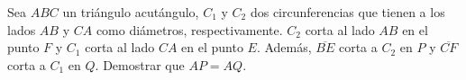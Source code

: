 Sea $ABC$ un triángulo acutángulo, $C_1$ y $C_2$ dos circunferencias que tienen a los lados $AB$ y $CA$ como diámetros, respectivamente. $C_2$ corta al lado $AB$ en el punto $F$ y $C_1$ corta al lado $CA$ en el punto $E$. Además, $\overline{BE}$ corta a $C_2$ en $P$ y $\overline{CF}$ corta a $C_1$ en $Q$. Demostrar que $AP=AQ$.
